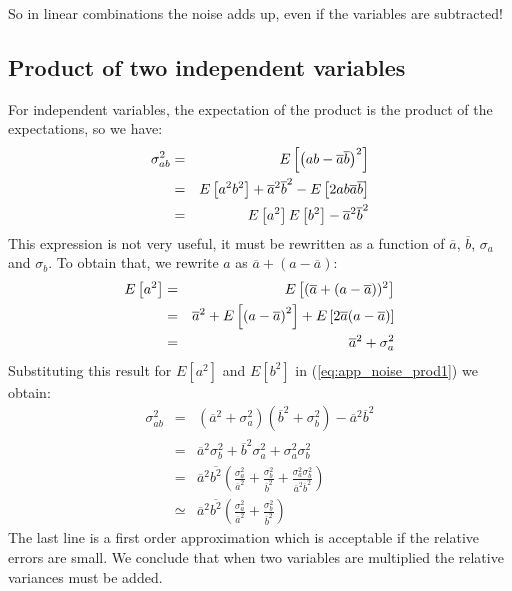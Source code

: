 So in linear combinations the noise adds up, even
if the variables are subtracted!

\subsection{Product of two independent variables}
For independent variables, the expectation of the product is the
product of the expectations, so we have:
\begin{eqnarray}
 \sigma_{ab}^2 & = & E\left[{\left( ab - \overline{a} \overline{b}\right)^2}\right] \nonumber\\
  & = & E\left[{a^2b^2}\right] + \overline{a}^2\overline{b}^2 - E\left[{2 a b \overline{a} \overline{b}}\right] \nonumber\\
  & = & E\left[{a^2}\right] E\left[{b^2}\right] - \overline{a}^2 \overline{b}^2 \label{eq:app_noise_prod1}
\end{eqnarray}
This expression is not very useful, it must be rewritten as a function of
$\overline{a}$, $\overline{b}$, $\sigma_a$ and $\sigma_b$. To obtain that, we rewrite $a$
as $\overline{a} + (a - \overline{a})$:
\begin{eqnarray}
  E\left[{a^2}\right] & = & E\left[{(\overline{a} + (a - \overline{a}))^2}\right] \nonumber\\
 & = & \overline{a}^2 + E\left[{\left( a - \overline{a} \right)^2}\right] + E\left[{2 \overline{a}(a - \overline{a})}\right]
       \nonumber\\
 & = & \overline{a}^2 + \sigma_a^2
\end{eqnarray}
Substituting this result for $E[a^2]$ and $E[b^2]$ in
(\ref{eq:app_noise_prod1}) we obtain:
\begin{eqnarray}
\sigma_{ab}^2 & = & (\overline{a}^2 + \sigma_a^2)(\overline{b}^2 + \sigma_b^2) 
                     - \overline{a}^2 \overline{b}^2 \nonumber\\
 & = & \overline{a}^2\sigma_b^2 + \overline{b}^2\sigma_a^2 + \sigma_a^2 \sigma_b^2
        \nonumber\\
 & = & \overline{a}^2\overline{b^2}\left( \frac{\sigma_a^2}{\overline{a}^2} + 
       \frac{\sigma_b^2}{\overline{b}^2} 
     + \frac{\sigma_a^2\sigma_b^2}{\overline{a}^2\overline{b}^2}\right)\\
 & \simeq & \overline{a}^2\overline{b^2}\left( \frac{\sigma_a^2}{\overline{a}^2} + 
       \frac{\sigma_b^2}{\overline{b}^2}\right)
\end{eqnarray}
The last line is a first order approximation which is acceptable if the
relative errors are small. We conclude that when two variables are multiplied
the relative variances must be added. 

